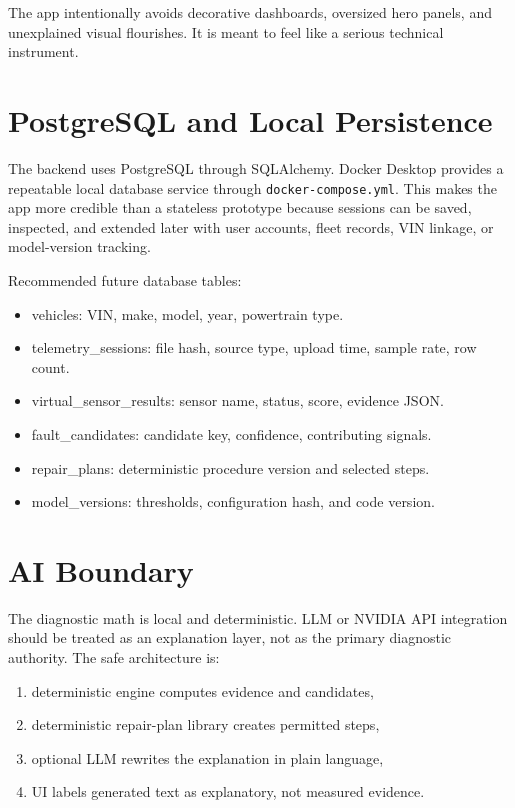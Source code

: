 \documentclass[11pt,a4paper]{article}
\begin{document}
The app intentionally avoids decorative dashboards, oversized hero panels, and unexplained visual flourishes. It is meant to feel like a serious technical instrument.

\section{PostgreSQL and Local Persistence}

The backend uses PostgreSQL through SQLAlchemy. Docker Desktop provides a repeatable local database service through \texttt{docker-compose.yml}. This makes the app more credible than a stateless prototype because sessions can be saved, inspected, and extended later with user accounts, fleet records, VIN linkage, or model-version tracking.

Recommended future database tables:

\begin{itemize}
\item vehicles: VIN, make, model, year, powertrain type.
\item telemetry\_sessions: file hash, source type, upload time, sample rate, row count.
\item virtual\_sensor\_results: sensor name, status, score, evidence JSON.
\item fault\_candidates: candidate key, confidence, contributing signals.
\item repair\_plans: deterministic procedure version and selected steps.
\item model\_versions: thresholds, configuration hash, and code version.
\end{itemize}

\section{AI Boundary}

The diagnostic math is local and deterministic. LLM or NVIDIA API integration should be treated as an explanation layer, not as the primary diagnostic authority. The safe architecture is:

\begin{enumerate}
\item deterministic engine computes evidence and candidates,
\item deterministic repair-plan library creates permitted steps,
\item optional LLM rewrites the explanation in plain language,
\item UI labels generated text as explanatory, not measured evidence.
\end{enumerate}
\end{document}
